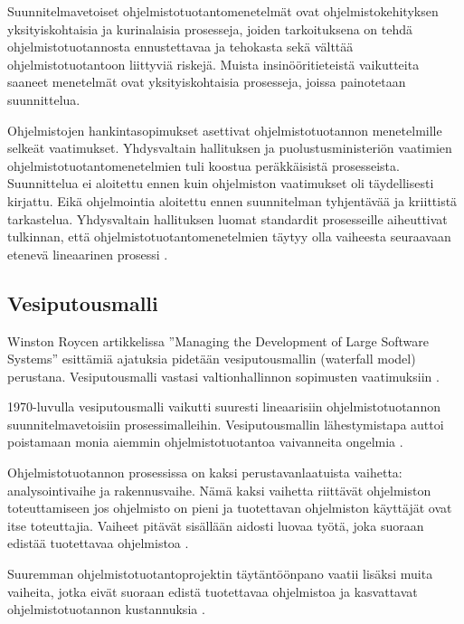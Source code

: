 \documentclass[finnish]{tktltiki2}
\theoremstyle{definition}
\theoremstyle{remark}
\begin{document}
Suunnitelmavetoiset ohjelmistotuotantomenetelmät ovat ohjelmistokehityksen yksityiskohtaisia ja kurinalaisia prosesseja, joiden tarkoituksena on tehdä ohjelmistotuotannosta ennustettavaa ja tehokasta sekä välttää ohjelmistotuotantoon liittyviä riskejä. Muista insinööritieteistä vaikutteita saaneet menetelmät ovat yksityiskohtaisia prosesseja, joissa painotetaan suunnittelua\cite{FOW01a}.

Ohjelmistojen hankintasopimukset asettivat ohjelmistotuotannon menetelmille selkeät vaatimukset. Yhdysvaltain hallituksen ja puolustusministeriön vaatimien ohjelmistotuotantomenetelmien tuli koostua peräkkäisistä prosesseista. Suunnittelua ei aloitettu ennen kuin ohjelmiston vaatimukset oli täydellisesti kirjattu. Eikä ohjelmointia aloitettu ennen suunnitelman tyhjentävää ja kriittistä tarkastelua. Yhdysvaltain hallituksen luomat standardit prosesseille aiheuttivat tulkinnan, että ohjelmistotuotantomenetelmien täytyy olla vaiheesta seuraavaan etenevä lineaarinen prosessi \cite{BOE06}.

\subsection{Vesiputousmalli}

Winston Roycen artikkelissa ''Managing the Development of Large Software Systems'' esittämiä ajatuksia pidetään vesiputousmallin (waterfall model) perustana. Vesiputousmalli vastasi valtionhallinnon sopimusten vaatimuksiin \cite{LAB03}.

1970-luvulla vesiputousmalli vaikutti suuresti lineaarisiin ohjelmistotuotannon suunnitelmavetoisiin prosessimalleihin. Vesiputousmallin lähestymistapa auttoi poistamaan monia aiemmin ohjelmistotuotantoa vaivanneita ongelmia \cite{BOE88}.

Ohjelmistotuotannon prosessissa on kaksi perustavanlaatuista vaihetta: analysointivaihe ja rakennusvaihe. Nämä kaksi vaihetta riittävät ohjelmiston toteuttamiseen jos ohjelmisto on pieni ja tuotettavan ohjelmiston käyttäjät ovat itse toteuttajia. Vaiheet pitävät sisällään aidosti luovaa työtä, joka suoraan edistää tuotettavaa ohjelmistoa \cite{ROY70}.

Suuremman ohjelmistotuotantoprojektin täytäntöönpano vaatii lisäksi muita vaiheita, jotka eivät suoraan edistä tuotettavaa ohjelmistoa ja kasvattavat ohjelmistotuotannon kustannuksia \cite{ROY70}.
\end{document}
